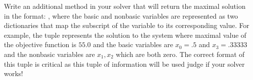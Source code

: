 \begin{problem}
Write an additional method in your solver that will return the maximal solution in the format: , where the basic and nonbasic variables are represented as two dictionaries that map the subscript of the variable to its corresponding value.
For example, the tuple  represents the solution to the system 
where maximal value of the objective function is $55.0$ and the 
basic variables are $x_0=.5$ and $x_3=.33333$ and the nonbasic variables are $x_1, x_2$ which are both zero.
The correct format of this tuple is critical as this tuple of information will be used judge if your solver works!
\end{problem}


% 
% 
% 
% 
